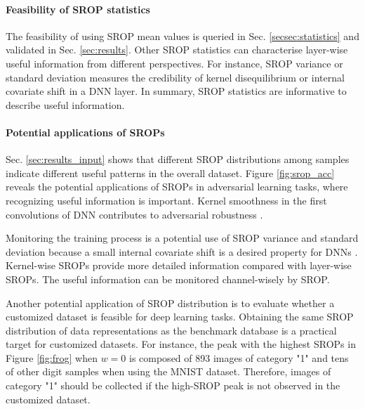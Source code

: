 \documentclass{article}
\begin{document}
\paragraph{Feasibility of SROP statistics} The feasibility of using SROP mean values is queried in Sec. \ref{secsec:statistics} and validated in Sec. \ref{sec:results}. Other SROP statistics can characterise layer-wise useful information from different perspectives. For instance, SROP variance or standard deviation measures the credibility of kernel disequilibrium or internal covariate shift in a DNN layer. In summary, SROP statistics are informative to describe useful information.

\paragraph{Potential applications of SROPs}
Sec. \ref{sec:results_input} shows that different SROP distributions among samples indicate different useful patterns in the overall dataset. Figure \ref{fig:srop_acc} reveals the potential applications of SROPs in adversarial learning tasks, where recognizing useful information is important. Kernel smoothness in the first convolutions of DNN contributes to adversarial robustness \cite{High-Frequency-Component-Helps-Explain-the}.

Monitoring the training process is a potential use of SROP variance and standard deviation because a small internal covariate shift is a desired property for DNNs \cite{bn}. Kernel-wise SROPs provide more detailed information compared with layer-wise SROPs. The useful information can be monitored channel-wisely by SROP.

Another potential application of SROP distribution is to evaluate whether a customized dataset is feasible for deep learning tasks. Obtaining the same SROP distribution of data representations as the benchmark database is a practical target for customized datasets. For instance, the peak with the highest SROPs in Figure \ref{fig:frog} when $w=0$ is composed of 893 images of category "1" and tens of other digit samples when using the MNIST dataset. Therefore, images of category "1" should be collected if the high-SROP peak is not observed in the customized dataset.
\end{document}
